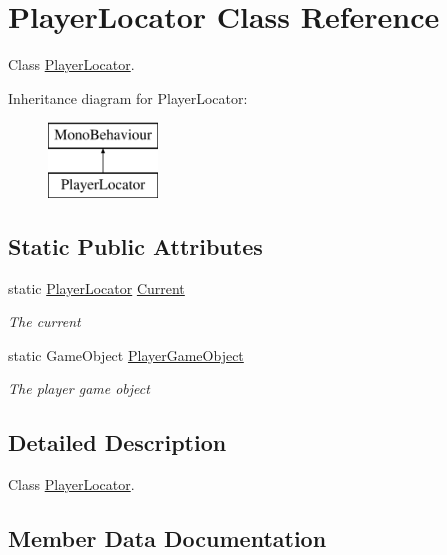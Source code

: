 \hypertarget{class_player_locator}{}\section{Player\+Locator Class Reference}
\label{class_player_locator}


Class \hyperlink{class_player_locator}{Player\+Locator}.  


Inheritance diagram for Player\+Locator\+:\begin{figure}[H]
\begin{center}
\leavevmode
\includegraphics[height=2.000000cm]{class_player_locator}
\end{center}
\end{figure}
\subsection*{Static Public Attributes}
\begin{DoxyCompactItemize}
\item 
static \hyperlink{class_player_locator}{Player\+Locator} \hyperlink{class_player_locator_a9e9c8c303c416556dfecd45067f48fae}{Current}
\begin{DoxyCompactList}\small\item\em The current \end{DoxyCompactList}\item 
static Game\+Object \hyperlink{class_player_locator_a38ead089d27d49efa91465b756f9bc08}{Player\+Game\+Object}
\begin{DoxyCompactList}\small\item\em The player game object \end{DoxyCompactList}\end{DoxyCompactItemize}


\subsection{Detailed Description}
Class \hyperlink{class_player_locator}{Player\+Locator}. 



\subsection{Member Data Documentation}
\mbox{\label{class_player_locator_a9e9c8c303c416556dfecd45067f48fae}} 
